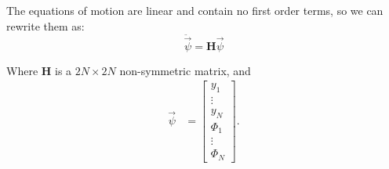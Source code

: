 \documentclass[linenumbers]{aastex7}
\begin{document}
The equations of motion are linear and contain no first order terms, so we can rewrite them as:
\begin{equation}
    \ddot{\vec{\psi}} = \mathbf{H}\vec{\psi}
\end{equation}

Where $\mathbf{H}$ is a $2N\times2N$ non-symmetric matrix, and
\begin{align}
    \vec{\psi} &= \begin{bmatrix}
        y_1 \\ \vdots \\ y_N \\ \Phi_1 \\ \vdots \\ \Phi_N  
    \end{bmatrix}.
\end{align}
\end{document}
